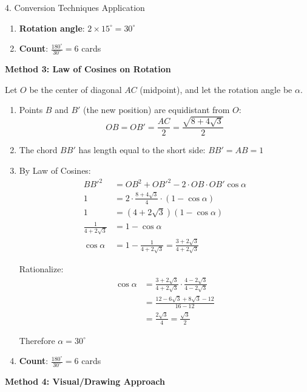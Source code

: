 \documentclass[12pt]{article}
\begin{document}
\begin{conversionbox}{4. Conversion Techniques Application}
\begin{enumerate}
    This is exactly $\sin 15^\circ$! Therefore $\angle BCA = 15^\circ$
    
    \item \textbf{Rotation angle}: $2 \times 15^\circ = 30^\circ$
    
    \item \textbf{Count}: $\frac{180^\circ}{30^\circ} = 6$ cards
\end{enumerate}

\textbf{Method 3: Law of Cosines on Rotation}

Let $O$ be the center of diagonal $AC$ (midpoint), and let the rotation angle be $\alpha$.

\begin{enumerate}
    \item Points $B$ and $B'$ (the new position) are equidistant from $O$:
    \[OB = OB' = \frac{AC}{2} = \frac{\sqrt{8+4\sqrt{3}}}{2}\]
    
    \item The chord $BB'$ has length equal to the short side: $BB' = AB = 1$
    
    \item By Law of Cosines:
    \begin{align*}
    BB'^2 &= OB^2 + OB'^2 - 2 \cdot OB \cdot OB' \cos\alpha\\
    1 &= 2 \cdot \frac{8+4\sqrt{3}}{4} \cdot (1 - \cos\alpha)\\
    1 &= (4+2\sqrt{3})(1 - \cos\alpha)\\
    \frac{1}{4+2\sqrt{3}} &= 1 - \cos\alpha\\
    \cos\alpha &= 1 - \frac{1}{4+2\sqrt{3}} = \frac{3+2\sqrt{3}}{4+2\sqrt{3}}
    \end{align*}
    
    Rationalize:
    \begin{align*}
    \cos\alpha &= \frac{3+2\sqrt{3}}{4+2\sqrt{3}} \cdot \frac{4-2\sqrt{3}}{4-2\sqrt{3}}\\
    &= \frac{12 - 6\sqrt{3} + 8\sqrt{3} - 12}{16-12}\\
    &= \frac{2\sqrt{3}}{4} = \frac{\sqrt{3}}{2}
    \end{align*}
    
    Therefore $\alpha = 30^\circ$
    
    \item \textbf{Count}: $\frac{180^\circ}{30^\circ} = 6$ cards
\end{enumerate}

\textbf{Method 4: Visual/Drawing Approach}


\end{conversionbox}
\end{document}

